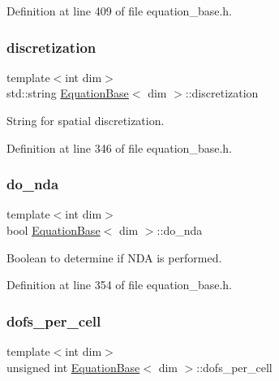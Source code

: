 Definition at line 409 of file equation\+\_\+base.\+h.

\mbox{\label{class_equation_base_adf124367d26087d33b6f252aa3cdd0a3}} 
\subsubsection{\texorpdfstring{discretization}{discretization}}
{\footnotesize\ttfamily template$<$int dim$>$ \\
std\+::string \hyperlink{class_equation_base}{Equation\+Base}$<$ dim $>$\+::discretization\hspace{0.3cm}{\ttfamily [protected]}}



String for spatial discretization. 



Definition at line 346 of file equation\+\_\+base.\+h.

\mbox{\label{class_equation_base_a908f21db148a15d7d51a8508aa1fc58a}} 
\subsubsection{\texorpdfstring{do\+\_\+nda}{do\_nda}}
{\footnotesize\ttfamily template$<$int dim$>$ \\
bool \hyperlink{class_equation_base}{Equation\+Base}$<$ dim $>$\+::do\+\_\+nda\hspace{0.3cm}{\ttfamily [protected]}}



Boolean to determine if N\+DA is performed. 



Definition at line 354 of file equation\+\_\+base.\+h.

\mbox{\label{class_equation_base_a66b4cac3e416505fba70789599a98d14}} 
\subsubsection{\texorpdfstring{dofs\+\_\+per\+\_\+cell}{dofs\_per\_cell}}
{\footnotesize\ttfamily template$<$int dim$>$ \\
unsigned int \hyperlink{class_equation_base}{Equation\+Base}$<$ dim $>$\+::dofs\+\_\+per\+\_\+cell\hspace{0.3cm}{\ttfamily [protected]}}



